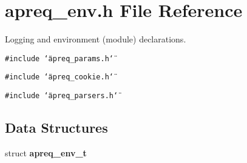 \section{apreq\_\-env.h File Reference}
\label{apreq__env_8h}
Logging and environment (module) declarations. 


{\tt \#include \char`\"{}apreq\_\-params.h\char`\"{}}\par
{\tt \#include \char`\"{}apreq\_\-cookie.h\char`\"{}}\par
{\tt \#include \char`\"{}apreq\_\-parsers.h\char`\"{}}\par
\subsection*{Data Structures}
\begin{CompactItemize}
\item 
struct {\bf apreq\_\-env\_\-t}
\end{CompactItemize}
